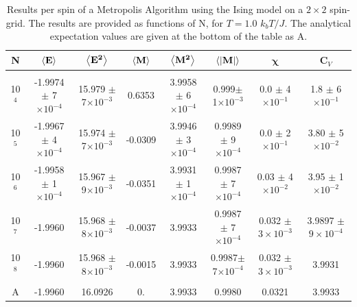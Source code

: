 \documentclass[%
reprint,nofootinbib,
amsmath,amssymb,
aps,
]{revtex4-1}
\begin{document}
\onecolumngrid 

\begin{table}[H]
	\caption{\label{2b}Results per spin of a Metropolis Algorithm using the Ising model on a $2\times 2$ spin-grid. The results are provided as functions of N, for $T = 1.0$ $k_bT/J$. The analytical expectation values are given at the bottom of the table as A.}
	\begin{tabular}{|c|c|c|c|c|c|c|c|} \hline 
		\textbf{N}  & \hspace{1mm}	$\expval{\mathbf{E}}$ \hspace{1mm} & \hspace{1mm}$\expval{\mathbf{E^2}}$ \hspace{1mm} & \hspace{1mm}	$\expval{\mathbf{M}}$\hspace{1mm}  &	\hspace{1mm} $\expval{\mathbf{M^2}}$ \hspace{1mm}  &	\hspace{1mm}$\expval{\abs{\mathbf{M}}} $\hspace{1mm} & \hspace{2mm}$\mathbf{\chi}$	\hspace{2mm} & \hspace{2mm}	\textbf{C}$_V$\hspace{2mm} \\ \hline 
		&&&&&&&\\
		10$^4$   &  -1.9974 $\pm$ 7$\times 10^{-4}$  & 15.979 $\pm$  7$\times 10^{-3}$   &  0.6353 &   3.9958 $\pm$ 6$\times 10^{-4}$&   0.999$\pm$  1$\times 10^{-3}$&   0.0 $\pm$ 4$\times 10^{-1}$&   1.8 $\pm$ 6$\times 10^{-1}$\\
		
		10$^5$    &          -1.9967    $\pm$  4$\times 10^{-4}$    & 15.974   $\pm$  7$\times 10^{-3}$ &  -0.0309 &   3.9946  $\pm$ 3 $\times 10^{-4}$ &   0.9989 $\pm$  9$\times 10^{-4}$&   0.0 $\pm$   2$\times 10^{-1}$ &   3.80 $\pm$  5$\times 10^{-2}$\\ 
		
		10$^6$  &          -1.9958 $\pm $ 1$\times 10^{-4}$   & 15.967   $\pm$   9$\times 10^{-3}$&  -0.0351 &   3.9931 $\pm $ 1$\times 10^{-4}$ &   0.9987 $\pm$  7$\times 10^{-4}$&   0.03  $\pm$   4$\times 10^{-2}$&   3.95 $\pm$   1$\times 10^{-2}$\\ 
		
		10$^7$  &          -1.9960  & 15.968 $\pm$  8$\times 10^{-3}$  &    -0.0037 &   3.9933 &   0.9987 $\pm$ 7$\times 10^{-4}$ &   0.032 $\pm$ $3\times 10^{-3}$&   3.9897 $\pm$ $9\times 10^{-4}$ \\ 
		10$^8$   &          -1.9960 & 15.968 $\pm$ 8$\times 10^{-3}$&  -0.0015 &   3.9933 &   0.9987$\pm$ 7$\times 10^{-4}$&   0.032 $\pm$  $3\times 10^{-3}$   &   3.9931\\ 
		&&&&&&&\\ \hline 
		A &-1.9960 & 16.0926  &0.    &  3.9933 & 0.9980  & 0.0321&  3.9933 \\ \hline 
	\end{tabular}
\end{table} 
\end{document}
